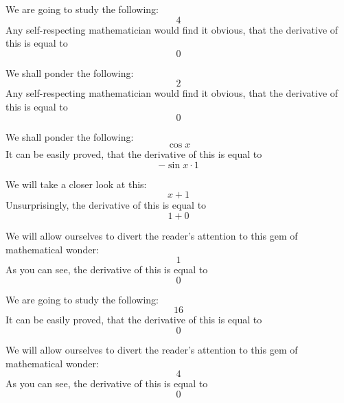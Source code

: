 \documentclass{article}
\begin{document}
We are going to study the following:
\begin{equation}
4 
\end{equation}
Any self-respecting mathematician would find it obvious, that the derivative of this is equal to
\begin{equation}
0 
\end{equation}

We shall ponder the following:
\begin{equation}
2 
\end{equation}
Any self-respecting mathematician would find it obvious, that the derivative of this is equal to
\begin{equation}
0 
\end{equation}

We shall ponder the following:
\begin{equation}
\cos x 
\end{equation}
It can be easily proved, that the derivative of this is equal to
\begin{equation}
-\sin x \cdot 1 
\end{equation}

We will take a closer look at this:
\begin{equation}
x + 1 
\end{equation}
Unsurprisingly, the derivative of this is equal to
\begin{equation}
1 + 0 
\end{equation}

We will allow ourselves to divert the reader's attention to this gem of mathematical wonder:
\begin{equation}
1 
\end{equation}
As you can see, the derivative of this is equal to
\begin{equation}
0 
\end{equation}

We are going to study the following:
\begin{equation}
16 
\end{equation}
It can be easily proved, that the derivative of this is equal to
\begin{equation}
0 
\end{equation}

We will allow ourselves to divert the reader's attention to this gem of mathematical wonder:
\begin{equation}
4 
\end{equation}
As you can see, the derivative of this is equal to
\begin{equation}
0 
\end{equation}
\end{document}
